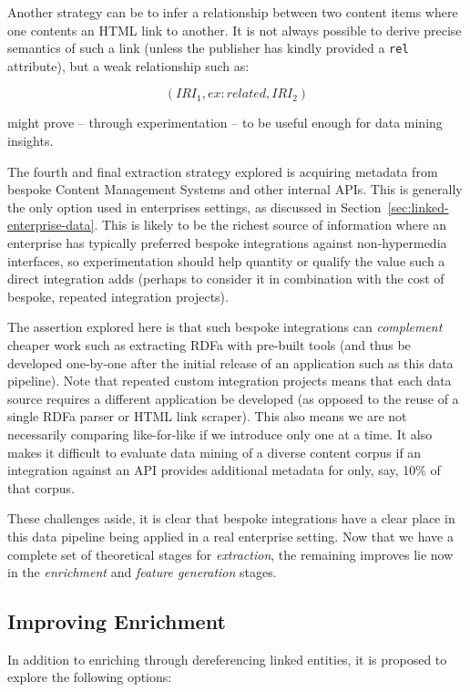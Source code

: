 Another strategy can be to infer a relationship between two content items where
one contents an HTML link to another. It is not always possible to derive
precise semantics of such a link (unless the publisher has kindly provided
a \texttt{rel} attribute), but a weak relationship such as:

$$
(IRI_1, ex:related, IRI_2)
$$

\noindent might prove -- through experimentation -- to be useful enough
for data mining insights.

The fourth and final extraction strategy explored is acquiring metadata from
bespoke Content Management Systems and other internal APIs. This is generally
the only option used in enterprises settings, as discussed in
Section~\ref{sec:linked-enterprise-data}. This is likely to be the richest
source of information where an enterprise has typically preferred bespoke
integrations against non-hypermedia interfaces, so experimentation should
help quantity or qualify the value such a direct integration adds (perhaps to
consider it in combination with the cost of bespoke, repeated integration
projects).

The assertion explored here is that such bespoke integrations can
\emph{complement} cheaper work such as extracting RDFa with pre-built tools
(and thus be developed one-by-one after the initial release of an application
such as this data pipeline). Note that repeated custom integration projects
means that each data source requires a different application be developed (as
opposed to the reuse of a single RDFa parser or HTML link scraper). This
also means we are not necessarily comparing like-for-like if we introduce only
one at a time. It also makes it
difficult to evaluate data mining of a diverse content corpus if an integration
against an API provides additional metadata for only, say, 10\% of that corpus.

These challenges aside, it is clear that bespoke integrations have a clear place
in this data pipeline being applied in a real enterprise setting. Now that
we have a complete set of theoretical stages for \emph{extraction}, the
remaining improves lie now in the \emph{enrichment} and
\emph{feature generation} stages.

\subsection{Improving Enrichment}

In addition to enriching through dereferencing linked entities, it is proposed
to explore the following options:

